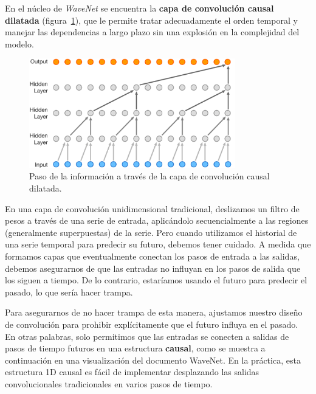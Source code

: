 \documentclass[a4paper,12pt]{article}
\begin{document}
En el núcleo de \textit{WaveNet} se encuentra la \textbf{capa de convolución causal dilatada} (figura~\ref{fig:causal-conv}), que le permite tratar adecuadamente el orden temporal y manejar las dependencias a largo plazo sin una explosión en la complejidad del modelo. \citep{wavenet}

\begin{figure}[H]
	\begin{center}				
		\includegraphics[width=0.8\textwidth]{causal-conv.png}
		\caption{Paso de la información a través de la capa de convolución causal dilatada. \citep{wavenet2}}
		\label{fig:causal-conv}
	\end{center}
\end{figure}

En una capa de convolución unidimensional tradicional, deslizamos un filtro de pesos a través de una serie de entrada, aplicándolo secuencialmente a las regiones (generalmente superpuestas) de la serie. Pero cuando utilizamos el historial de una serie temporal para predecir su futuro, debemos tener cuidado. A medida que formamos capas que eventualmente conectan los pasos de entrada a las salidas, debemos asegurarnos de que las entradas no influyan en los pasos de salida que los siguen a tiempo. De lo contrario, estaríamos usando el futuro para predecir el pasado, lo que sería hacer trampa.

Para asegurarnos de no hacer trampa de esta manera, ajustamos nuestro diseño de convolución para prohibir explícitamente que el futuro influya en el pasado. En otras palabras, solo permitimos que las entradas se conecten a salidas de pasos de tiempo futuros en una estructura \textbf{causal}, como se muestra a continuación en una visualización del documento WaveNet. En la práctica, esta estructura 1D causal es fácil de implementar desplazando las salidas convolucionales tradicionales en varios pasos de tiempo.
\end{document}

